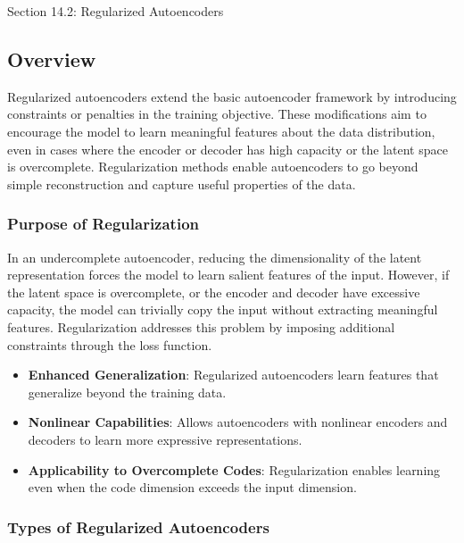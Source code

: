 \begin{notes}{Section 14.2: Regularized Autoencoders}
    \subsection*{Overview}

    Regularized autoencoders extend the basic autoencoder framework by introducing constraints or penalties in the training objective. These modifications aim to encourage the model to learn meaningful 
    features about the data distribution, even in cases where the encoder or decoder has high capacity or the latent space is overcomplete. Regularization methods enable autoencoders to go beyond simple 
    reconstruction and capture useful properties of the data.
    
    \subsubsection*{Purpose of Regularization}
    
    In an undercomplete autoencoder, reducing the dimensionality of the latent representation forces the model to learn salient features of the input. However, if the latent space is overcomplete, or the 
    encoder and decoder have excessive capacity, the model can trivially copy the input without extracting meaningful features. Regularization addresses this problem by imposing additional constraints 
    through the loss function.
    
    \begin{highlight}
        \begin{itemize}
            \item \textbf{Enhanced Generalization}: Regularized autoencoders learn features that generalize beyond the training data.
            \item \textbf{Nonlinear Capabilities}: Allows autoencoders with nonlinear encoders and decoders to learn more expressive representations.
            \item \textbf{Applicability to Overcomplete Codes}: Regularization enables learning even when the code dimension exceeds the input dimension.
        \end{itemize}
    \end{highlight}
    
    \subsubsection*{Types of Regularized Autoencoders}
    

\end{notes}
